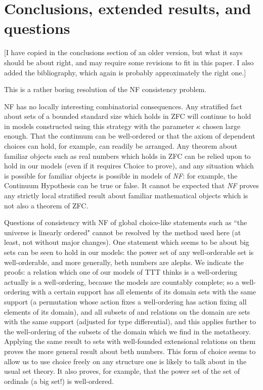 \documentclass[112pt]{article}
\begin{document}
\newpage

\section{Conclusions, extended results, and questions}
[I have copied in the conclusions section of an older version, but what it says should be about right, 
and may require some revisions to fit in this paper.  I also added the bibliography, which again is probably approximately the right one.]

This is a rather boring resolution of the NF consistency problem.

NF has no locally interesting combinatorial consequences.   Any stratified fact about sets of a bounded standard size which holds in ZFC will continue to hold in models constructed using this strategy with the parameter $\kappa$ chosen large enough.
That the continuum can be well-ordered or that the axiom of dependent choices can hold, for example, can readily be arranged.  Any theorem about familiar objects such as real numbers which holds in ZFC can be relied upon to hold in our models
(even if it requires Choice to prove), and any situation which is possible for familiar objects is possible in models of {\em NF\/}:  for example, the Continuum Hypothesis can be true or false.  It cannot be expected that {\em NF\/} proves any strictly local stratified result about familiar mathematical objects which is not also a theorem of ZFC.

Questions of consistency with NF of global choice-like statements such as ``the universe is linearly ordered"  cannot be resolved by the method used here (at least, not without major changes).  One statement which seems to be about big sets can be seen to hold in our models:  the power set of any well-orderable set is well-orderable, and more generally, beth numbers are alephs.  We indicate the proofs:  a relation which one of our models of TTT thinks is a well-ordering actually is a well-ordering, because the models are countably complete;  so a well-ordering with a certain support has all elements of its domain sets with the same support (a permutation whose action fixes a well-ordering has action fixing all elements of its domain), and all subsets of and relations on the domain are sets with the same support (adjusted for type differential), and this applies further to the well-ordering of the subsets of the domain which we find in the metatheory.  Applying the same result to sets with well-founded extensional relations on them proves the more general result about beth numbers.  This form of choice seems to allow us to use choice freely on any structure one is likely to talk about in the usual set theory.  It also proves, for example, that the power set of the set of ordinals (a big set!) is well-ordered.
\end{document}

